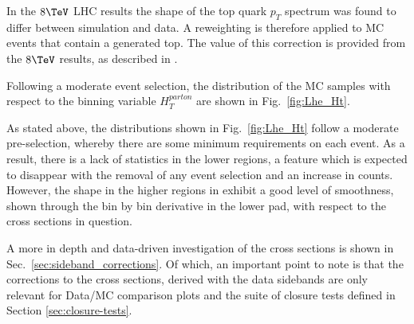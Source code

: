 In the $8\tev$ LHC results the shape of the top quark $p_{T}$ spectrum
was found to differ between simulation and data. A reweighting is
therefore applied to MC events that contain a generated top. The value of
this correction is provided from the $8\tev$ results, as described in
\cite{twiki-TopPtReweighting}.

Following a moderate event selection, the distribution of the MC samples
with respect to the binning variable $H_{T}^{parton}$ are shown in Fig.~\ref{fig:Lhe_Ht}.

As stated above, the distributions shown in Fig.~\ref{fig:Lhe_Ht} follow a moderate pre-selection, 
whereby there are some minimum requirements on each event. 
As a result, there is a lack of statistics in the lower \HT regions, a feature which 
is expected to disappear with the removal of any event selection and an increase in counts.
However, the shape in the higher regions in \HT exhibit a good level of smoothness,
shown through the bin by bin derivative in the lower pad, with respect to the cross sections in question.

A more in depth and data-driven investigation of the cross sections is shown in Sec.~\ref{sec:sideband_corrections}. 
Of which, an important point to note is that the corrections to the cross sections, 
derived with the data sidebands are only relevant for Data/MC comparison plots and the suite of closure tests defined in Section \ref{sec:closure-tests}.

